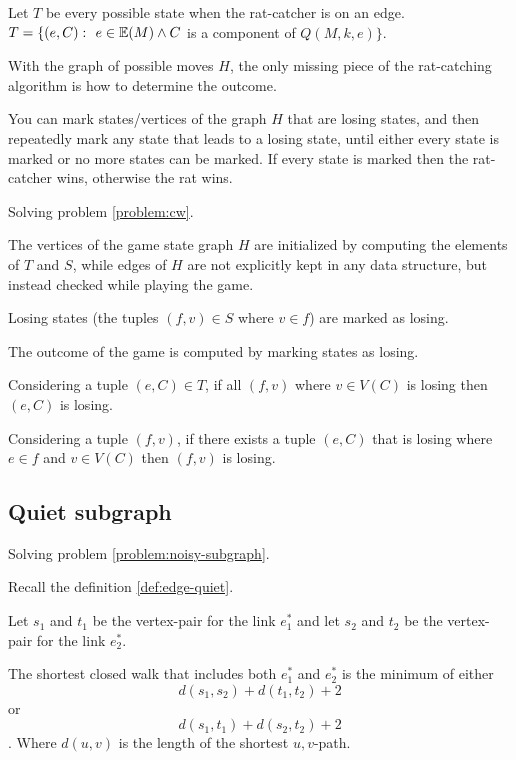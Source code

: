 \documentclass{article}
\begin{document}
		Let $T$ be every possible state when the rat-catcher is on an edge. $T = \{ (e, C) \,\colon\  e \in \mathbb{E}(M) \land C$ is a component of $Q(M, k, e) \}$.
		
		With the graph of possible moves $H$, the only missing piece of the rat-catching algorithm is how to determine the outcome.

		You can mark states/vertices of the graph $H$ that are losing states, and then repeatedly mark any state that leads to a losing state, until either every state is marked or no more states can be marked. If every state is marked then the rat-catcher wins, otherwise the rat wins.

		Solving problem \ref{problem:cw}.

		The vertices of the game state graph $H$ are initialized by computing the elements of $T$ and $S$, while edges of $H$ are not explicitly kept in any data structure, but instead checked while playing the game.

		Losing states (the tuples $(f,v) \in S$ where $v \in f$) are marked as losing.

		The outcome of the game is computed by marking states as losing.
		
		Considering a tuple $(e, C) \in T$, if all $(f, v)$ where $v \in V(C)$ is losing then $(e, C)$ is losing.

		Considering a tuple $(f, v)$, if there exists a tuple $(e, C)$ that is losing where $e \in f$ and $v \in V(C)$ then $(f, v)$ is losing.


		\subsection{Quiet subgraph}

			Solving problem \ref{problem:noisy-subgraph}.

			Recall the definition \ref{def:edge-quiet}.

			Let $s_1$ and $t_1$ be the vertex-pair for the link $e_1^*$ and let $s_2$ and $t_2$ be the vertex-pair for the link $e_2^*$.

			\begin{claim}
				The shortest closed walk that includes both $e_1^*$ and $e_2^*$ is the minimum of either $$d(s_1, s_2) + d(t_1, t_2) + 2$$ or $$d(s_1, t_1) + d(s_2, t_2) + 2$$. Where $d(u, v)$ is the length of the shortest $u,v$-path.
			\end{claim}
\end{document}
